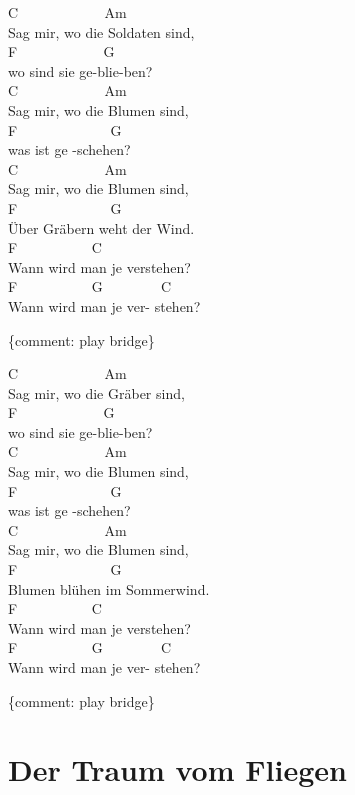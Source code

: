 \documentclass[
  letterpaper,
]{scrbook}
\begin{document}
C ~ ~ ~ ~ ~ ~ ~ Am ~ ~ ~ ~ ~\\
Sag mir, wo die Soldaten sind,\\
F ~ ~ ~ ~ ~ ~ ~ G\\
wo sind sie ge-blie-ben?\\
C ~ ~ ~ ~ ~ ~ ~ Am ~ ~ ~ ~ ~\\
Sag mir, wo die Blumen sind,\\
F ~ ~ ~ ~ ~ ~ ~ ~G\\
was ist ge -schehen?\\
C ~ ~ ~ ~ ~ ~ ~ Am ~ ~ ~ ~ ~\\
Sag mir, wo die Blumen sind,\\
F ~ ~ ~ ~ ~ ~ ~ ~G\\
Über Gräbern weht der Wind.\\
F ~ ~ ~ ~ ~ ~ C ~ ~ ~ ~ ~ ~ ~ ~\\
Wann wird man je verstehen? ~ ~\\
F ~ ~ ~ ~ ~ ~ G ~ ~ ~ ~ ~C\\
Wann wird man je ver- stehen?

\{comment: play bridge\}

C ~ ~ ~ ~ ~ ~ ~ Am ~ ~ ~ ~ ~\\
Sag mir, wo die Gräber sind,\\
F ~ ~ ~ ~ ~ ~ ~ G\\
wo sind sie ge-blie-ben?\\
C ~ ~ ~ ~ ~ ~ ~ Am ~ ~ ~ ~ ~\\
Sag mir, wo die Blumen sind,\\
F ~ ~ ~ ~ ~ ~ ~ ~G\\
was ist ge -schehen?\\
C ~ ~ ~ ~ ~ ~ ~ Am ~ ~ ~ ~ ~\\
Sag mir, wo die Blumen sind,\\
F ~ ~ ~ ~ ~ ~ ~ ~G\\
Blumen blühen im Sommerwind.\\
F ~ ~ ~ ~ ~ ~ C ~ ~ ~ ~ ~ ~ ~ ~\\
Wann wird man je verstehen? ~ ~\\
F ~ ~ ~ ~ ~ ~ G ~ ~ ~ ~ ~C\\
Wann wird man je ver- stehen?

\{comment: play bridge\}

\hypertarget{der-traum-vom-fliegen}{%
\chapter{Der Traum vom Fliegen}\label{der-traum-vom-fliegen}}
\end{document}
